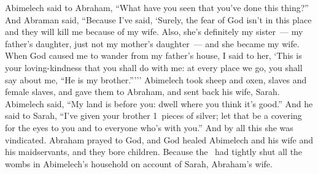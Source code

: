 \begin{inparaenum}
   Abimelech said to Abraham, ``What have you seen that you've done this thing?''%
   And Abraman said, ``Because I've said, `Surely, the fear of God isn't in this place and they will kill me because of my wife.%
   Also, she's definitely my sister~--- my father's daughter, just not my mother's daughter~--- and she became my wife.%
   When God caused me to wander from my father's house, I said to her, `This is your loving-kindness that you shall do with me: at every place we go, you shall say about me, ``He is my brother.''\thinspace'\thinspace''%
   Abimelech took sheep and oxen, slaves and female slaves, and gave them to Abraham, and sent back his wife, Sarah.%
   Abimelech said, ``My land is before you: dwell where you think it's good.''%
   And he said to Sarah, ``I've given your brother 1~pieces of silver; let that be a covering for the eyes to you and to everyone who's with you.'' And by all this she was vindicated.%
   Abraham prayed to God, and God healed Abimelech and his wife and his maidservants, and they bore children.\understood%
   Because the \lord\ had tightly shut all the wombs in Abimelech's household on account of Sarah, Abraham's wife.%
\end{inparaenum}
